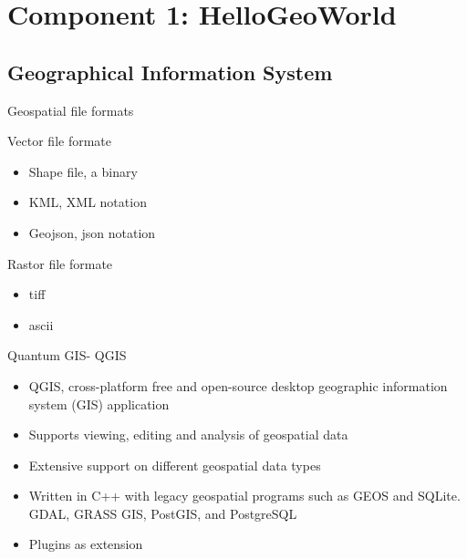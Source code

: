 \section[Component 1]{Component 1: HelloGeoWorld}
\subsection[Geographical Information System]{Geographical Information System}

\begin{frame}{Geospatial file formats}
	\begin{beamerboxesrounded}{Vector file formate}
		\begin{itemize}
			\item Shape file, a binary 
			\item KML, XML notation 
			\item Geojson, json notation
		\end{itemize}
	\end{beamerboxesrounded}
	\begin{beamerboxesrounded}{Rastor file formate}
		\begin{itemize}
			\item tiff
			\item ascii  
		\end{itemize}
	\end{beamerboxesrounded}
\end{frame}

\begin{frame}{Quantum GIS- QGIS}
		\begin{beamerboxesrounded}{}
			\begin{itemize}
				\item QGIS, cross-platform free and open-source desktop geographic information system (GIS) application
				\item Supports viewing, editing and analysis of geospatial data 
				\item Extensive support on different geospatial data types
				\item Written in C++ with legacy geospatial programs such as GEOS and SQLite. GDAL, GRASS GIS, PostGIS, and PostgreSQL
				\item Plugins as extension 
			\end{itemize}
		\end{beamerboxesrounded}
	\end{frame}
	

